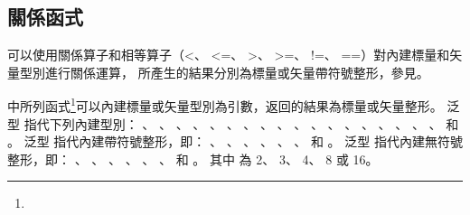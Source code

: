 \subsection{關係函式}

可以使用關係算子和相等算子（<、 <=、 >、 >=、 !=、 ==）對內建標量和矢量型別進行關係運算，
所產生的結果分別為標量或矢量帶符號整形，參見。

中所列函式\footnote{
}可以內建標量或矢量型別為引數，返回的結果為標量或矢量整形。
泛型  指代下列內建型別：
 、 、 、 、
 、 、 、 、
 、 、 、 、
 、 、 、 、
 、 、  和 。
泛型  指代內建帶符號整形，即：
 、 、 、 、
 、 、  和 。
泛型  指代內建無符號整形，即：
 、 、 、 、
 、 、  和 。
其中  為 2、 3、 4、 8 或 16。

